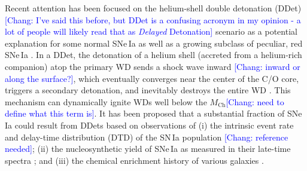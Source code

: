 \documentclass[twocolumn]{aastex631}
\newcommand{\Mch}{$M_\mathrm{Ch}$}
\newcommand{\chang}[1]{\textcolor{blue}{[Chang: #1]}}
\begin{document}
\begin{CJK*}{UTF8}{gbsn}
Recent attention has been focused on the helium-shell double detonation (DDet) \chang{I've said this before, but DDet is a confusing acronym in my opinion - a lot of people will likely read that as \textit{Delayed} Detonation} scenario as a potential explanation for some normal SNe\,Ia \citep[e.g.,][]{Polin_2019,Shen_2D_2021} as well as a growing subclass of peculiar, red SNe\,Ia \citep[e.g.,][]{jiang_16jhr_2017, de_18byg_2019,Ni_2022, Liu_20jgb_2023}. In a DDet, the detonation of a helium shell (accreted from a helium-rich companion) atop the primary WD sends a shock wave inward \chang{inward or along the surface?}, which eventually converges near the center of the C/O core, triggers a secondary detonation, and inevitably destroys the entire WD \citep{Nomoto_1982a,Nomoto_1982b,Woosley_1986,Livne_1990,Woosley_1994,Livne_1995}. This mechanism can dynamically ignite WDs well below the \Mch \chang{need to define what this term is}. It has been proposed that a substantial fraction of SNe\,Ia could result from DDets based on observations of (i) the intrinsic event rate and delay-time distribution (DTD) of the SN\,Ia population \citep{} \chang{reference needed}; (ii) the nucleosynthetic yield of SNe\,Ia as measured in their late-time spectra \citep{Maguire_2018,Flors_2020}; and (iii) the chemical enrichment history of various galaxies \citep{de_los_reyes_manganese_2020,Sanders_2021,Eitner_2022}. 


\end{CJK*}
\end{document}
